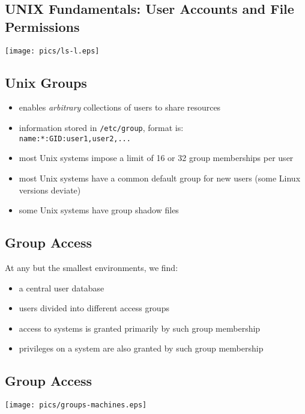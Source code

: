 \documentclass[xga]{xdvislides}
\begin{document}
\subsection{UNIX Fundamentals: User Accounts and File Permissions}
\vfill
\begin{center}
	\texttt{[image: pics/ls-l.eps]}
\end{center}
\vfill



\subsection{Unix Groups}
\begin{itemize}
	\item enables {\em arbitrary} collections of users to share resources
	\item information stored in \verb+/etc/group+, format is: \\
		\verb+name:*:GID:user1,user2,...+
	\item most Unix systems impose a limit of 16 or 32 group memberships per
		user
	\item most Unix systems have a common default group for new users (some
		Linux versions deviate)
	\item some Unix systems have group shadow files
\end{itemize}

\subsection{Group Access}
At any but the smallest environments, we find:
\begin{itemize}
	\item a central user database
	\item users divided into different access groups
	\item access to systems is granted primarily by such group membership
	\item privileges on a system are also granted by such group membership
\end{itemize}

\subsection{Group Access}
\begin{center}
	\texttt{[image: pics/groups-machines.eps]}
\end{center}
\end{document}
